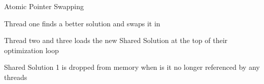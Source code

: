 \documentclass{beamer}
\begin{document}
\begin{frame}{}
    \begin{block}{Atomic Pointer Swapping}
		\drawAtomicPointerSwapping[onesolution=true]
    \end{block}
\end{frame}

\begin{frame}{}
    \begin{block}{Thread one finds a better solution and swaps it in}
		\drawAtomicPointerSwapping[twosolutions=true]
    \end{block}
\end{frame}

\begin{frame}{}
    \begin{block}{Thread two and three loads the new Shared Solution at the top of their optimization loop}
		\drawAtomicPointerSwapping[threesolutions=true]
    \end{block}
\end{frame}

\begin{frame}{}
    \begin{block}{Shared Solution 1 is dropped from memory when is it no longer referenced by any threads}
		\drawAtomicPointerSwapping[threesolutions=true]
    \end{block}
\end{frame}
\end{document}
